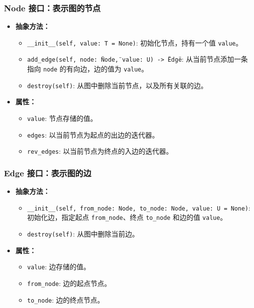 \documentclass[10pt]{article}
\begin{document}
    \subsubsection{Node 接口：表示图的节点}
    \begin{itemize}[label=\textbullet]
        \item \textbf{抽象方法：}
        \begin{itemize}[label=\textbullet]
            \item \texttt{\_\_init\_\_(self, value: T = None)}: 初始化节点，持有一个值 \texttt{value}。
            \item \texttt{add\_edge(self, node: \"Node\", value: U) -> \"Edge\"}: 从当前节点添加一条指向 \texttt{node} 的有向边，边的值为 \texttt{value}。
            \item \texttt{destroy(self)}: 从图中删除当前节点，以及所有关联的边。
        \end{itemize}
        \item \textbf{属性：}
        \begin{itemize}[label=\textbullet]
            \item \texttt{value}: 节点存储的值。
            \item \texttt{edges}: 以当前节点为起点的出边的迭代器。
            \item \texttt{rev\_edges}: 以当前节点为终点的入边的迭代器。
        \end{itemize}
    \end{itemize}

    \subsubsection{Edge 接口：表示图的边}
    \begin{itemize}[label=\textbullet]
        \item \textbf{抽象方法：}
        \begin{itemize}[label=\textbullet]
            \item \texttt{\_\_init\_\_(self, from\_node: Node, to\_node: Node, value: U = None)}: 初始化边，指定起点 \texttt{from\_node}、终点 \texttt{to\_node} 和边的值 \texttt{value}。
            \item \texttt{destroy(self)}: 从图中删除当前边。
        \end{itemize}
        \item \textbf{属性：}
        \begin{itemize}[label=\textbullet]
            \item \texttt{value}: 边存储的值。
            \item \texttt{from\_node}: 边的起点节点。
            \item \texttt{to\_node}: 边的终点节点。
        \end{itemize}
    \end{itemize}
\end{document}
